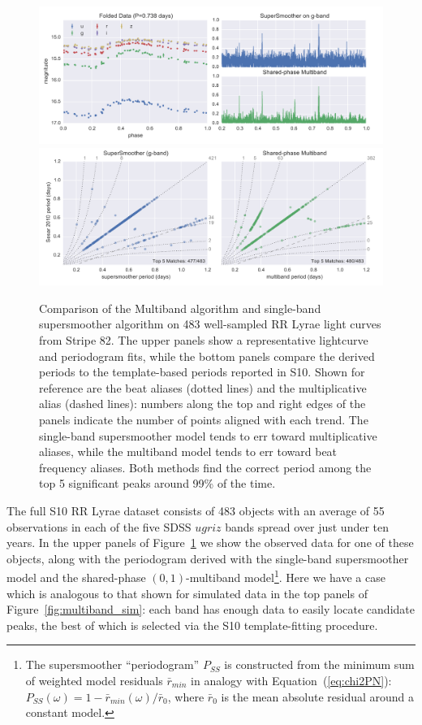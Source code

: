 \documentclass{emulateapj}
\newcommand{\Fig}[1]{Figure~\ref{fig:#1}}
\newcommand{\fig}[1]{\Fig{#1}}
\newcommand{\figlabel}[1]{\label{fig:#1}}
\newcommand{\Eq}[1]{Equation~(\ref{eq:#1})}
\newcommand{\eq}[1]{\Eq{#1}}
\begin{document}
\begin{figure}
  \centering
  \includegraphics[width=\textwidth]{fig07a.pdf}
  \includegraphics[width=\textwidth]{fig07b.pdf}
  \caption{
    Comparison of the Multiband algorithm and single-band supersmoother algorithm on 483 well-sampled RR Lyrae light curves from Stripe 82.
    The upper panels show a representative lightcurve and periodogram fits, while the bottom panels compare the derived periods to the template-based periods reported in S10.
    Shown for reference are the beat aliases (dotted lines) and the multiplicative alias (dashed lines): numbers along the top and right edges of the panels indicate the number of points aligned with each trend.
    The single-band supersmoother model tends to err toward multiplicative aliases, while the multiband model tends to err toward beat frequency aliases.
    Both methods find the correct period among the top 5 significant peaks around 99\% of the time.
  } 
  \figlabel{compare_periods}
\end{figure}

The full S10 RR Lyrae dataset consists of 483 objects with an average of 55 observations in each of the five SDSS $ugriz$ bands spread over just under ten years.  In the upper panels of \fig{compare_periods} we show the observed data for one of these objects, along with the periodogram derived with the single-band supersmoother model and the shared-phase $(0, 1)$-multiband model\footnote{The supersmoother ``periodogram'' $P_{SS}$ is constructed from the minimum sum of weighted model residuals $\bar{r}_{min}$ in analogy with \eq{chi2PN}: $P_{SS}(\omega) = 1 - \bar{r}_{min}(\omega) / \bar{r}_0$, where $\bar{r}_0$ is the mean absolute residual around a constant model.}. Here we have a case which is analogous to that shown for simulated data in the top panels of \fig{multiband_sim}: each band has enough data to easily locate candidate peaks, the best of which is selected via the S10 template-fitting procedure.
\end{document}
